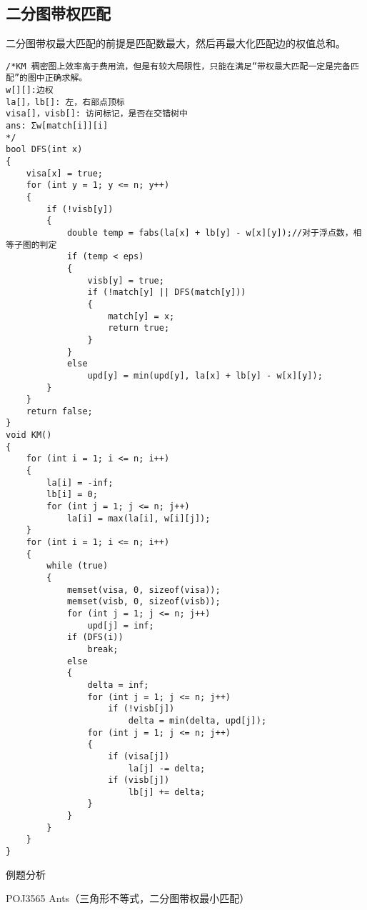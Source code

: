 \subsection{二分图带权匹配}
二分图带权最大匹配的前提是匹配数最大，然后再最大化匹配边的权值总和。
\begin{lstlisting}
/*KM 稠密图上效率高于费用流，但是有较大局限性，只能在满足“带权最大匹配一定是完备匹配”的图中正确求解。
w[][]:边权
la[]，lb[]: 左，右部点顶标
visa[]，visb[]: 访问标记，是否在交错树中
ans: Σw[match[i]][i]
*/
bool DFS(int x)
{
    visa[x] = true;
    for (int y = 1; y <= n; y++)
    {
        if (!visb[y])
        {
            double temp = fabs(la[x] + lb[y] - w[x][y]);//对于浮点数，相等子图的判定
            if (temp < eps)
            {
                visb[y] = true;
                if (!match[y] || DFS(match[y]))
                {
                    match[y] = x;
                    return true;
                }
            }
            else
                upd[y] = min(upd[y], la[x] + lb[y] - w[x][y]);
        }
    }
    return false;
}
void KM()
{
    for (int i = 1; i <= n; i++)
    {
        la[i] = -inf;
        lb[i] = 0;
        for (int j = 1; j <= n; j++)
            la[i] = max(la[i], w[i][j]);
    }
    for (int i = 1; i <= n; i++)
    {
        while (true)
        {
            memset(visa, 0, sizeof(visa));
            memset(visb, 0, sizeof(visb));
            for (int j = 1; j <= n; j++)
                upd[j] = inf;
            if (DFS(i))
                break;
            else
            {
                delta = inf;
                for (int j = 1; j <= n; j++)
                    if (!visb[j])
                        delta = min(delta, upd[j]);
                for (int j = 1; j <= n; j++)
                {
                    if (visa[j])
                        la[j] -= delta;
                    if (visb[j])
                        lb[j] += delta;
                }
            }
        }
    }
}
\end{lstlisting}

例题分析

POJ3565 Ants（三角形不等式，二分图带权最小匹配）